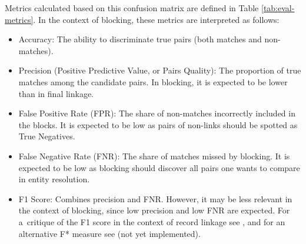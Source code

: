 Metrics calculated based on this confusion matrix are defined in Table
\ref{tab:eval-metrics}. In the context of blocking, these metrics are
interpreted as follows:

\begin{itemize}
\tightlist
\item
  Accuracy: The ability to discriminate true pairs (both matches and
  non-matches).
\item
  Precision (Positive Predictive Value, or Pairs Quality): The
  proportion of true matches among the candidate pairs. In blocking,
  it is expected to be lower than in final linkage.
\item
  False Positive Rate (FPR): The share of non-matches incorrectly
  included in the blocks. It is expected to be low as pairs of
  non-links should be spotted as True Negatives.
\item
  False Negative Rate (FNR): The share of matches missed by blocking.
  It is expected to be low as blocking should discover all pairs one
  wants to compare in entity resolution.
\item
  F1 Score: Combines precision and FNR. However, it may be less relevant in the context of blocking, since low precision and low FNR are expected. For a~critique of the F1 score in the context of record linkage see \citet{hand2018}, and for an alternative F* measure see \citet{hand2021} (not yet implemented).
\end{itemize}

